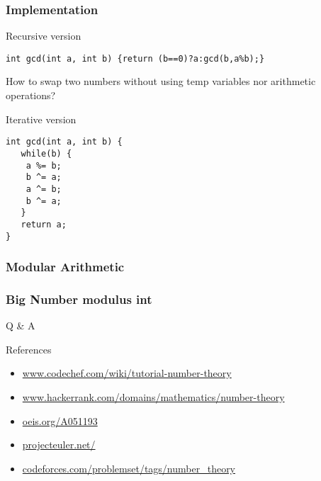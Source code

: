 \documentclass{beamer}
\begin{document}
\begin{frame}[fragile]
\frametitle{Implementation}
\begin{block}{Recursive version}
\begin{lstlisting}
int gcd(int a, int b) {return (b==0)?a:gcd(b,a%b);}
\end{lstlisting}
\end{block}

  How to swap two numbers without using temp variables nor arithmetic operations?
 \begin{block}{Iterative version}
\begin{lstlisting}
int gcd(int a, int b) {
   while(b) {
   	a %= b;
	b ^= a;
	a ^= b;
	b ^= a;
   }
   return a;
}
\end{lstlisting}
\end{block}
\end{frame}

\begin{frame}
\frametitle{Modular Arithmetic}
\end{frame}

\begin{frame}
\frametitle{ Big Number modulus int}
\end{frame}
\begin{frame}
\Huge{\centerline{ Q \& A }}

\normalsize
{
\begin{block}{References}
\begin{itemize}
\item \url{www.codechef.com/wiki/tutorial-number-theory}
\item \url{www.hackerrank.com/domains/mathematics/number-theory}
\item \url{oeis.org/A051193}
\item \url{projecteuler.net/}
\item \url{codeforces.com/problemset/tags/number_theory}
\end{itemize}
\end{block}
}
\end{frame}

\end{document}

